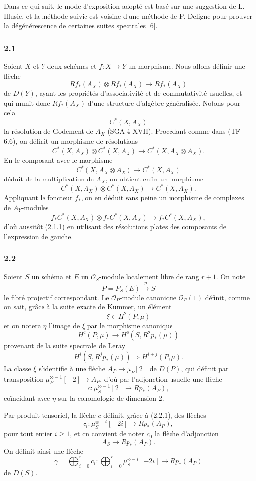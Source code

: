 \documentclass[11pt]{article}
\begin{document}
Dans ce qui suit, le mode d'exposition adopté est basé sur une suggestion de L. Illusie, et la méthode suivie est voisine d'une méthode de P. Deligne pour prouver la dégénérescence de certaines suites spectrales [6].

\subsubsection*{2.1}
Soient $X$ et $Y$ deux schémas et $f:X\to Y$ un morphisme. Nous allons définir une flèche
\[
Rf_*(A_X)\otimes Rf_*(A_X)\longrightarrow Rf_*(A_X)
\tag{2.1.1}
\]
de $D(Y)$, ayant les propriétés d'associativité et de commutativité usuelles, et qui munit donc $Rf_*(A_X)$ d'une structure d'algèbre généralisée. Notons pour cela
\[
C^*(X,A_X)
\]
la résolution de Godement de $A_X$ (SGA 4 XVII). Procédant comme dans (TF 6.6), on définit un morphisme de résolutions
\[
C^*(X,A_X)\otimes C^*(X,A_X)\longrightarrow C^*(X,A_X\otimes A_X).
\]
En le composant avec le morphisme
\[
C^*(X,A_X\otimes A_X)\longrightarrow C^*(X,A_X)
\]
déduit de la multiplication de $A_X$, on obtient enfin un morphisme
\[
C^*(X,A_X)\otimes C^*(X,A_X)\longrightarrow C^*(X,A_X).
\tag{2.1.2}
\]
Appliquant le foncteur $f_*$, on en déduit sans peine un morphisme de complexes de $A_Y$-modules
\[
f_*C^*(X,A_X)\otimes f_*C^*(X,A_X)\longrightarrow f_*C^*(X,A_X),
\]
d'où aussitôt (2.1.1) en utilisant des résolutions plates des composants de l'expression de gauche.

\subsubsection*{2.2}
Soient $S$ un schéma et $E$ un $\mathcal O_S$-module localement libre de rang $r+1$. On note
\[
P=P_S(E)\xrightarrow{p}S
\]
le fibré projectif correspondant. Le $\mathcal O_P$-module canonique $\mathcal O_P(1)$ définit, comme on sait, grâce à la suite exacte de Kummer, un élément
\[
\xi\in H^2(P,\mu)
\]
et on notera $\eta$ l'image de $\xi$ par le morphisme canonique
\[
H^2(P,\mu)\longrightarrow H^0(S,R^2p_*(\mu))
\]
provenant de la suite spectrale de Leray
\[
H^i(S,R^jp_*(\mu))\Rightarrow H^{i+j}(P,\mu).
\]
La classe $\xi$ s'identifie à une flèche $A_P\to\mu_P[2]$ de $D(P)$, qui définit par transposition $\mu_P^{\otimes -1}[-2]\to A_P$, d'où par l'adjonction usuelle une flèche
\[
c:\mu_S^{\otimes -1}[2]\longrightarrow Rp_*(A_P),
\]
coïncidant avec $\eta$ sur la cohomologie de dimension $2$.

Par produit tensoriel, la flèche $c$ définit, grâce à (2.2.1), des flèches
\[
c_i:\mu_S^{\otimes -i}[-2i]\longrightarrow Rp_*(A_P),
\]
pour tout entier $i\ge1$, et on convient de noter $c_0$ la flèche d'adjonction
\[
A_S\longrightarrow Rp_*(A_P).
\]
On définit ainsi une flèche
\[
\gamma=\bigoplus_{i=0}^{r}c_i:
\bigoplus_{i=0}^{r}\mu_S^{\otimes -i}[-2i]\longrightarrow Rp_*(A_P)
\]
de $D(S)$.
\end{document}
